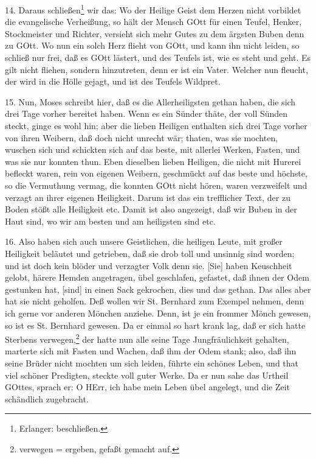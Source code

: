 14. Daraus schließen\footnote{Erlanger: beschließen.} wir das: Wo der Heilige Geist dem Herzen nicht vorbildet die evangelische Verheißung, so hält der Mensch GOtt für einen Teufel, Henker, Stockmeister und Richter, versieht sich mehr Gutes zu dem ärgsten Buben denn zu GOtt. Wo nun ein solch Herz flieht von GOtt, und kann ihn nicht leiden, so schließ nur frei, daß es GOtt lästert, und des Teufels ist, wie es steht und geht. Es gilt nicht fliehen, sondern hinzutreten, denn er ist ein Vater. Welcher nun fleucht, der wird in die Hölle gejagt, und ist des Teufels Wildpret.

15. Nun, Moses schreibt hier, daß es die Allerheiligsten gethan haben, die sich drei Tage vorher bereitet haben. Wenn es ein Sünder thäte, der voll Sünden steckt, ginge es wohl hin; aber die lieben Heiligen enthalten sich drei Tage vorher von ihren Weibern, daß doch nicht unrecht wär; thaten, was sie mochten, wuschen sich und schickten sich auf das beste, mit allerlei Werken, Fasten, und was sie nur konnten thun. Eben dieselben lieben Heiligen, die nicht mit Hurerei befleckt waren, rein von eigenen Weibern, geschmückt auf das beste und höchste, so die Vermuthung vermag, die konnten GOtt nicht hören, waren verzweifelt und verzagt an ihrer eigenen Heiligkeit. Darum ist das ein trefflicher Text, der zu Boden stößt alle Heiligkeit etc. Damit ist also angezeigt, daß wir Buben in der Haut sind, wo wir am besten und am heiligsten sind etc.

16. Also haben sich auch unsere Geistlichen, die heiligen Leute, mit großer Heiligkeit beläutet und getrieben, daß sie drob toll und unsinnig sind worden; und ist doch kein blöder und verzagter Volk denn sie. [Sie] haben Keuschheit gelobt, härere Hemden angetragen, übel geschlafen, gefastet, daß ihnen der Odem gestunken hat, [sind] in einen Sack gekrochen, dies und das gethan. Das alles aber hat sie nicht geholfen. Deß wollen wir St. Bernhard zum Exempel nehmen, denn ich gerne vor anderen Mönchen anziehe. Denn, ist je ein frommer Mönch gewesen, so ist es St. Bernhard gewesen. Da er einmal so hart krank lag, daß er sich hatte Sterbens verwegen,\footnote{verwegen = ergeben, gefaßt gemacht auf.} der hatte nun alle seine Tage Jungfräulichkeit gehalten, marterte sich mit Fasten und Wachen, daß ihm der Odem stank; also, daß ihn seine Brüder nicht mochten um sich leiden, führte ein schönes Leben, und that viel schöner Predigten, steckte voll guter Werke. Da er nun sahe das Urtheil GOttes, sprach er: O HErr, ich habe mein Leben übel angelegt, und die Zeit schändlich zugebracht.

